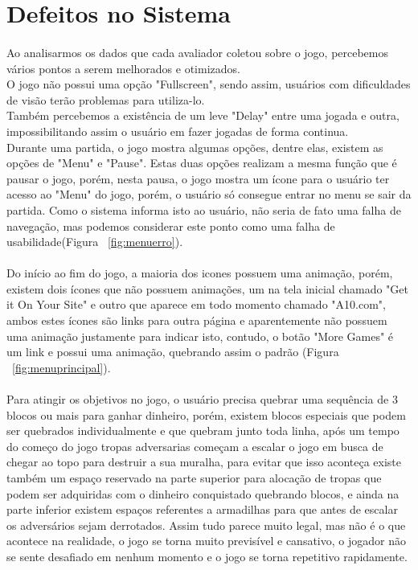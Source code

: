 \documentclass[12pt]{article}
\begin{document}
\section{Defeitos no Sistema}

\paragraph{} Ao analisarmos os dados que cada avaliador coletou sobre o jogo, percebemos vários pontos a serem melhorados e otimizados.\\
O jogo não possui uma opção "Fullscreen", sendo assim, usuários com dificuldades de visão terão problemas para utiliza-lo. \\
Também percebemos a existência de um leve "Delay" entre uma jogada e outra, impossibilitando assim o usuário em fazer jogadas de forma continua. \\
Durante uma partida, o jogo mostra algumas opções, dentre elas, existem as opções de "Menu" e "Pause". Estas duas opções realizam a mesma função que é pausar o jogo, porém, nesta pausa, o jogo mostra um ícone para o usuário ter acesso ao "Menu" do jogo, porém, o usuário só consegue entrar no menu se sair da partida. Como o sistema informa isto ao usuário, não seria de fato uma falha de navegação, mas podemos considerar este ponto como uma falha de usabilidade(Figura ~\ref{fig:menuerro}).
\paragraph{} Do início ao fim do jogo, a maioria dos icones possuem uma animação, porém, existem dois ícones que não possuem animações, um na tela inicial chamado "Get it On Your Site" e outro que aparece em todo momento chamado "A10.com", ambos estes ícones são links para outra página e aparentemente não possuem uma animação justamente para indicar isto, contudo, o botão "More Games" é um link e possui uma animação, quebrando assim o padrão (Figura ~\ref{fig:menuprincipal}).
\paragraph{} Para atingir os objetivos no jogo, o usuário precisa quebrar uma sequência de 3 blocos ou mais para ganhar dinheiro, porém, existem blocos especiais que podem ser quebrados individualmente e que quebram junto toda linha, após um tempo do começo do jogo tropas adversarias começam a escalar o jogo em busca de chegar ao topo para destruir a sua muralha, para evitar que isso aconteça existe também um espaço reservado na parte superior para alocação de tropas que podem ser adquiridas com o dinheiro conquistado quebrando blocos, e ainda na parte inferior existem espaços referentes a armadilhas para que antes de escalar os adversários sejam derrotados. Assim tudo parece muito legal, mas não é o que acontece na realidade, o jogo se torna muito previsível e cansativo, o jogador não se sente desafiado em nenhum momento e o jogo se torna repetitivo rapidamente.
\end{document}
